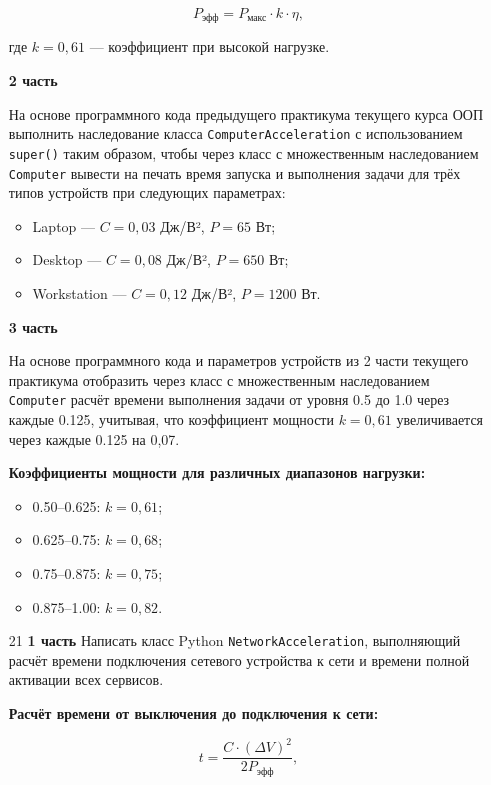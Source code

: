 \begin{enumerate}
\begin{equation}
P_{\text{эфф}} = P_{\text{макс}} \cdot k \cdot \eta,
\end{equation}

где $k = 0{,}61$ — коэффициент при высокой нагрузке.

\textbf{2 часть}

На основе программного кода предыдущего практикума текущего курса ООП выполнить наследование класса \texttt{ComputerAcceleration} с использованием \texttt{super()} таким образом, чтобы через класс с множественным наследованием \texttt{Computer} вывести на печать время запуска и выполнения задачи для трёх типов устройств при следующих параметрах:

\begin{itemize}
    \item Laptop — $C = 0{,}03$ Дж/В², $P = 65$ Вт;  
    \item Desktop — $C = 0{,}08$ Дж/В², $P = 650$ Вт;  
    \item Workstation — $C = 0{,}12$ Дж/В², $P = 1200$ Вт.  
\end{itemize}

\textbf{3 часть}

На основе программного кода и параметров устройств из 2 части текущего практикума отобразить через класс с множественным наследованием \texttt{Computer} расчёт времени выполнения задачи от уровня 0.5 до 1.0 через каждые 0.125, учитывая, что коэффициент мощности $k = 0{,}61$ увеличивается через каждые 0.125 на 0{,}07.

\textbf{Коэффициенты мощности для различных диапазонов нагрузки:}
\begin{itemize}
    \item 0.50–0.625: $k = 0{,}61$;  
    \item 0.625–0.75: $k = 0{,}68$;  
    \item 0.75–0.875: $k = 0{,}75$;  
    \item 0.875–1.00: $k = 0{,}82$.  
\end{itemize}


\item[21] \textbf{1 часть}  
Написать класс Python \texttt{NetworkAcceleration}, выполняющий расчёт времени подключения сетевого устройства к сети и времени полной активации всех сервисов.

\textbf{Расчёт времени от выключения до подключения к сети:}

\begin{equation}
t = \frac{C \cdot (\Delta V)^2}{2P_{\text{эфф}}},
\end{equation}


\end{enumerate}
